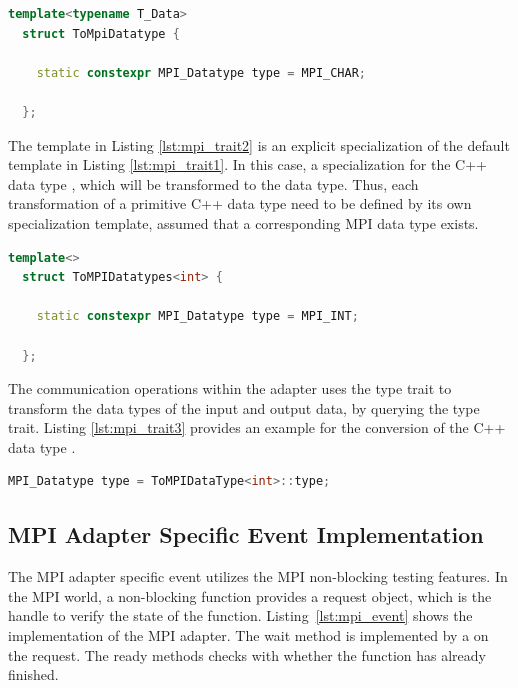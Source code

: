 \begin{lstlisting}[language=C++, label=lst:mpi_trait1]
  template<typename T_Data> 
  struct ToMpiDatatype { 

    static constexpr MPI_Datatype type = MPI_CHAR; 

  };
\end{lstlisting}

\noindent The template in Listing \ref{lst:mpi_trait2} is an explicit
specialization of the default template in Listing
\ref{lst:mpi_trait1}. In this case, a specialization for the C++ data
type , which will be transformed to the  data type.  Thus,
each transformation of a primitive C++ data type need to be defined
by its own specialization template, assumed that a corresponding
MPI data type exists.

\begin{lstlisting}[language=C++, label=lst:mpi_trait2]
  template<>
  struct ToMPIDatatypes<int> { 

    static constexpr MPI_Datatype type = MPI_INT; 

  };
\end{lstlisting}

\noindent The communication operations within the adapter uses the type trait to
transform the data types of the input and output data, by querying the
type trait. Listing \ref{lst:mpi_trait3} provides an example for the conversion 
of the C++ data type .

\begin{lstlisting}[language=C++, label=lst:mpi_trait3]
  MPI_Datatype type = ToMPIDataType<int>::type;
\end{lstlisting}

\subsection{MPI Adapter Specific Event Implementation}
The MPI adapter specific event utilizes the MPI non-blocking testing
features. In the MPI world, a non-blocking function provides a request
object, which is the handle to verify the state of the
function. Listing~\ref{lst:mpi_event} shows the 
implementation of the MPI adapter.  The wait method is implemented by
a  on the request. The ready methods checks with
 whether the function has already finished.


